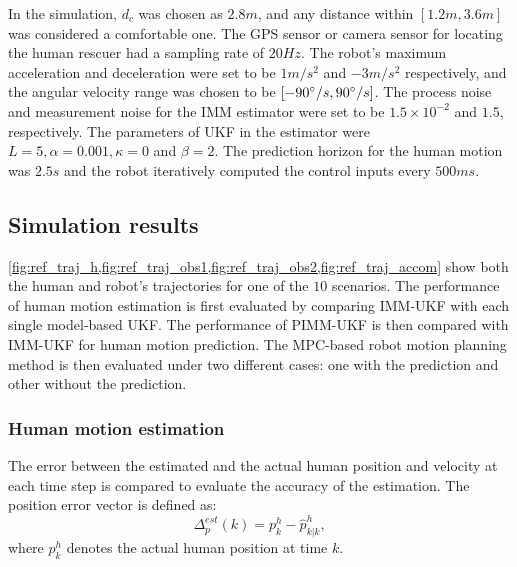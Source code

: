 \documentclass[journal]{IEEEtran}
\DeclareRobustCommand{\clnote}[1]{\ifthenelse{\boolean{include-notes}}%
{\textcolor{orange}{\textbf{CL: #1}}}{}}
\DeclareRobustCommand{\dhnote}[1]{\ifthenelse{\boolean{include-notes}}%
{\textcolor{blue}{\textbf{DH: #1}}}{}}
\begin{document}
	In the simulation, $d_c$ was chosen as $2.8m$, and any distance within $[1.2m,3.6m]$ was considered a comfortable one.
	The GPS sensor or camera sensor for locating the human rescuer had a sampling rate of $20Hz$.
	The robot's maximum acceleration and deceleration were set to be $1 m/s^2$ and $-3 m/s^2$ respectively, and the angular velocity range was chosen to be $[-90\degree/s,90\degree/s]$.
	The process noise and measurement noise for the IMM estimator were set to be $1.5\times 10^{-2}$ and $1.5$, respectively. 
    The parameters of UKF in the estimator were $L=5,\alpha=0.001, \kappa=0$ and $\beta=2$.
	The prediction horizon for the human motion was $2.5s$ and the robot iteratively computed the control inputs every $500ms$.
    
\subsection{Simulation results}
	\cref{fig:ref_traj_h,fig:ref_traj_obs1,fig:ref_traj_obs2,fig:ref_traj_accom} show both the human and robot's trajectories for one of the $10$ scenarios.	
The performance of human motion estimation is first evaluated by comparing IMM-UKF with each single model-based UKF. The performance of PIMM-UKF is then compared with IMM-UKF for human motion prediction.
	The MPC-based robot motion planning method is then evaluated under two different cases: one with the prediction and other without the prediction.
	\subsubsection{Human motion estimation}\label{subsubsec:motion_est}
	The error between the estimated and the actual human position and velocity at each time step is compared to evaluate the accuracy of the estimation.
	The position error vector is defined as:
	\[
	\Delta^{est}_p(k)=p^h_k-\hat{p}^h_{k|k}\label{eqn:track_err_pos},
	\] \normalsize
	where $p^h_k$ denotes the actual human position at time $k$. 
	
\end{document}
